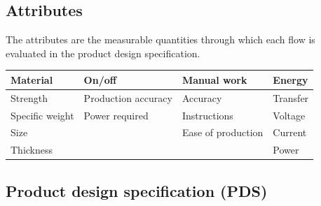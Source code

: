 \documentclass[11pt]{article}
\begin{document}
\subsection{Attributes}

The attributes are the measurable quantities through which each flow is evaluated in the
product design specification.

\begin{center}
\begin{tabular}{@{}llll@{}}
\toprule
\textbf{Material} & \textbf{On/off} & \textbf{Manual work} & \textbf{Energy} \\
\midrule
Strength        & Production accuracy & Accuracy            & Transfer \\
Specific weight & Power required      & Instructions        & Voltage \\
Size            &                     & Ease of production  & Current \\
Thickness       &                     &                     & Power \\
\bottomrule
\end{tabular}
\end{center}

\subsection{Product design specification (PDS)}
\end{document}

